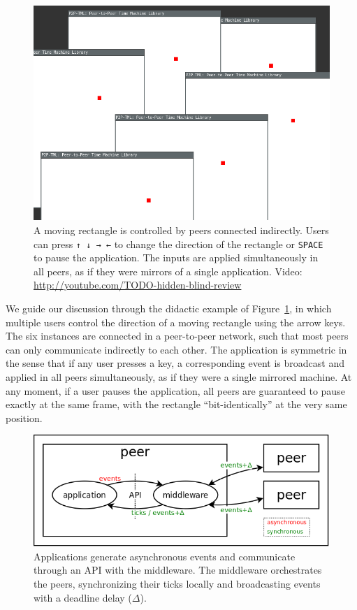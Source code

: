 \documentclass[sn-mathphys,iicol]{sn-jnl}%
\newcommand{\code}[1]  {\texttt{\small{#1}}}
\begin{document}
\begin{figure}
    \centering
    \includegraphics[width=\linewidth]{move}
    \caption[XXX] {
        A moving rectangle is controlled by peers connected indirectly.
        Users can press \code{↑ ↓ → ←} to change the direction of the
        rectangle or \code{SPACE} to pause the application.
        The inputs are applied simultaneously in all peers, as if they were
        mirrors of a single application.
        Video: \url{http://youtube.com/TODO-hidden-blind-review}
        \label{fig.move}
    }
\end{figure}

We guide our discussion through the didactic example of Figure~\ref{fig.move},
in which multiple users control the direction of a moving rectangle using the
arrow keys.
The six instances are connected in a peer-to-peer network, such that most
peers can only communicate indirectly to each other.
%
The application is symmetric in the sense that if any user presses a key, a
corresponding event is broadcast and applied in all peers simultaneously, as
if they were a single mirrored machine.
At any moment, if a user pauses the application, all peers are guaranteed to
pause exactly at the same frame, with the rectangle ``bit-identically'' at the
very same position.

\begin{figure}
  \centering
  \includegraphics[width=\linewidth]{middleware}
  \caption{
    Applications generate asynchronous events and communicate through an API
    with the middleware.
    The middleware orchestrates the peers, synchronizing their ticks locally
    and broadcasting events with a deadline delay ($\Delta$).
    \label{fig.middleware}
  }
\end{figure}
\end{document}

